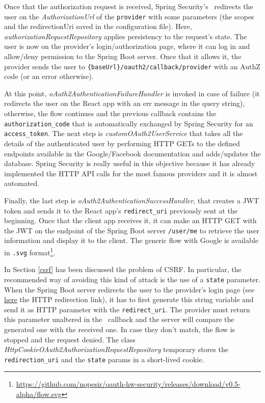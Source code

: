 Once that the authorization request is received, Spring Security's \oauth\ redirects the user on the \textit{AuthorizationUrl} of the \texttt{provider} with some parameters (the scopes and the redirectionUri saved in the configuration file). Here, \textit{authorizationRequestRepository} applies persistency to the request's state. The user is now on the provider's login/authorization page, where it can log in and allow/deny permission to the Spring Boot server. Once that it allows it, the provider sends the user to \texttt{\{baseUrl\}/oauth2/callback/provider} with an AuthZ code (or an error otherwise).

At this point, \textit{oAuth2AuthenticationFailureHandler} is invoked in case of failure (it redirects the user on the React app with an err message in the query string), otherwise, the flow continues and the previous callback contains the \texttt{authorization\_code} that is automatically exchanged by Spring Security for an \texttt{access\_token}. The next step is \textit{customOAuth2UserService} that takes all the details of the authenticated user by performing HTTP GETs to the defined endpoints available in the Google/Facebook documentation and adds/updates the database. Spring Security is really useful in this objective because it has already implemented the HTTP API calls for the most famous providers and it is almost automated. 

Finally, the last step is \textit{oAuth2AuthenticationSuccessHandler}, that creates a JWT token and sends it to the React app's \texttt{redirect\_uri} previously sent at the beginning. Once that the client app receives it, it can make an HTTP GET with the JWT on the endpoint of the Spring Boot server \texttt{/user/me} to retrieve the user information and display it to the client. The generic flow with Google is available in \texttt{.svg} format\footnote{\url{https://github.com/nopesir/oauth-hw-security/releases/download/v0.5-alpha/flow.svg}}.


In Section \ref{csrf} has been discussed the problem of CSRF. In particular, the recommended way of avoiding this kind of attack is the use of a \texttt{state} parameter. When the Spring Boot server redirects the user to the provider's login page (see \hyperlink{foo}{here} the HTTP redirection link), it has to first generate this string variable and send it as HTTP parameter with the \texttt{redirect\_uri}. The provider must return this parameter unaltered in the \oauth\ callback and the server will compare the generated one with the received one. In case they don't match, the flow is stopped and the request denied.
The class \textit{HttpCookieOAuth2AuthorizationRequestRepository} temporary stores the \texttt{redirection\_uri} and the \texttt{state} params in a short-lived cookie.

